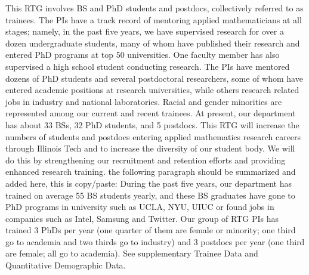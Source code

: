 \documentclass[11pt]{NSFamsart}
\newcommand{\numUG}{33\xspace}
\newcommand{\numPhD}{32\xspace}
\newcommand{\numPostDoc}{5\xspace}
\begin{document}
 This RTG involves BS and PhD students and postdocs, collectively referred to as trainees.  The PIs have a track record of mentoring  applied mathematicians at all stages; namely, in the past five years, we have supervised research for over a dozen undergraduate students, many of whom have published their research and entered PhD programs at top 50 universities. One faculty member has also supervised a high school student conducting research.  The PIs have  mentored dozens of PhD students and several postdoctoral researchers, some of whom have entered academic positions at research universities, while others research related jobs in industry and national laboratories. Racial and gender minorities are represented among our current and recent trainees. 
At present, our department has about \numUG BSs, \numPhD PhD students, and \numPostDoc postdocs.  This RTG will increase the numbers of students and postdocs entering applied mathematics research careers through Illinois Tech and to increase the diversity of our student body.  We will do this by strengthening our recruitment and retention efforts and providing enhanced research training.
{\color{red}the following paragraph should be summarized and added here, this is copy/paste:} During the past five years, our department has trained on average 55 BS students yearly, and these BS graduates have gone to PhD programs in university such as UCLA, NYU, UIUC or found jobs in companies such as Intel, Samsung and Twitter. Our group of RTG PIs has trained 3 PhDs per year (one quarter of them are female or minority; one third go to academia and two thirds go to industry)  and 3 postdocs per year (one third are female; all go to academia).  See supplementary Trainee Data and Quantitative Demographic Data. 
\end{document}
